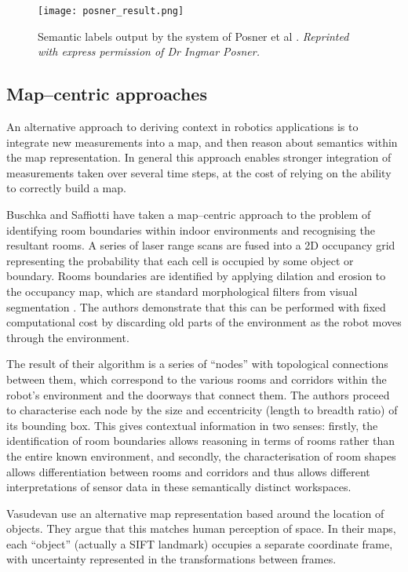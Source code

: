 \begin{figure}[tb]
  \centering
  \texttt{[image: posner\_result.png]}
  \caption{Semantic labels output by the system of Posner et al
    \cite{Posner08}.
    \textit{Reprinted with express permission of Dr Ingmar Posner.}
  }
  \label{fig:posner-result}
\end{figure}

\subsection{Map--centric approaches}
An alternative approach to deriving context in robotics applications is
to integrate new measurements into a map, and then reason about
semantics within the map representation. In general this approach
enables stronger integration of measurements taken over several time
steps, at the cost of relying on the ability to correctly build a map.

Buschka and Saffiotti \cite{Buschka02} have taken a map--centric
approach to the problem of identifying room boundaries within indoor
environments and recognising the resultant rooms. A series of laser
range scans are fused into a 2D occupancy grid representing the
probability that each cell is occupied by some object or
boundary. Rooms boundaries are identified by applying dilation and
erosion to the occupancy map, which are standard morphological filters
from visual segmentation \cite{Forsyth02}. The
authors demonstrate that this can be performed with fixed
computational cost by discarding old parts of the environment as the
robot moves through the environment.

The result of their algorithm is a series of ``nodes'' with topological
connections between them, which correspond to the various rooms and
corridors within the robot's environment and the doorways that connect
them. The authors proceed to characterise each node by the size and
eccentricity (length to breadth ratio) of its bounding box. This gives
contextual information in two senses: firstly, the identification of
room boundaries allows reasoning in terms of rooms rather than the
entire known environment, and secondly, the characterisation of room
shapes allows differentiation between rooms and corridors and thus
allows different interpretations of sensor data in these semantically
distinct workspaces.

Vasudevan \etal \cite{Vasudevan07} use an alternative map representation
based around the location of objects. They argue that this matches
human perception of space. In their maps, each ``object'' (actually a
SIFT landmark) occupies a separate coordinate frame, with uncertainty
represented in the transformations between frames.

